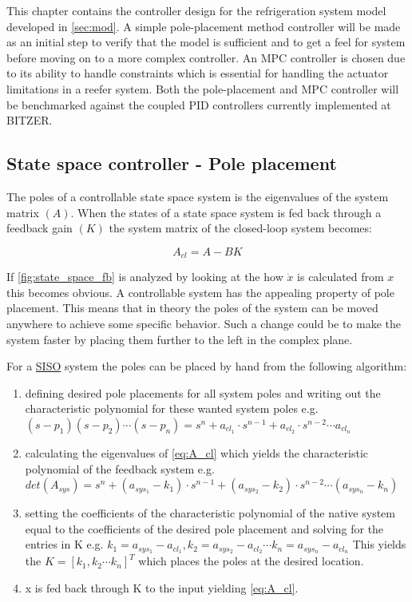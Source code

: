 This chapter contains the controller design for the refrigeration system model developed in \cref{sec:mod}. A simple pole-placement method controller will be made as an initial step to verify that the model is sufficient and to get a feel for system before moving on to a more complex controller. An MPC controller is chosen due to its ability to handle constraints which is essential for handling the actuator limitations in a reefer system. Both the pole-placement and MPC controller will be benchmarked against the coupled PID controllers currently implemented at BITZER.


\subsection{State space controller - Pole placement}
The poles of a controllable state space system is the eigenvalues of the system matrix $(A)$. When the states of a state space system is fed back through a feedback gain $(K)$ the system matrix of the closed-loop system becomes:

\begin{equation} \label{eq:A_cl}
	A_{cl} = A-BK
\end{equation}

If \cref{fig:state_space_fb} is analyzed by looking at the how $\dot{x}$ is calculated from $x$ this becomes obvious. A controllable system has the appealing property of  pole placement. This means that in theory the poles of the system can be moved anywhere to achieve some specific behavior. Such a change could be to make the system faster by placing them further to the left in the complex plane.

For a \underline{SISO} system the poles can be placed by hand from the following algorithm:
\begin{enumerate}
	\item defining desired pole placements for all system poles and writing out the characteristic polynomial for these wanted system poles e.g.
	$(s-p_1)(s-p_2) \cdots (s-p_n) = s^n + a_{cl_1} \cdot s^{n-1} + a_{cl_2} \cdot s^{n-2} \cdots a_{cl_n}$
	\item calculating the eigenvalues of \cref{eq:A_cl} which yields the characteristic polynomial of the feedback system e.g.
	$det(A_{sys}) = s^n + (a_{sys_1}-k_1) \cdot s^{n-1} + (a_{sys_2}-k_2) \cdot s^{n-2} \cdots (a_{sys_n}-k_n)$
	\item setting the coefficients of the characteristic polynomial of the native system equal to the coefficients of the desired pole placement and solving for the entries in K e.g.
	$ k_1 = a_{sys_1}-a_{cl_1}, k_2 = a_{sys_2}-a_{cl_2} \cdots k_n = a_{sys_n}-a_{cl_n} $
	 This yields the $ K = [k_1, k_2 \cdots k_n]^T $ which places the poles at the desired location.
	\item x is fed back through K to the input yielding \cref{eq:A_cl}.
\end{enumerate}

